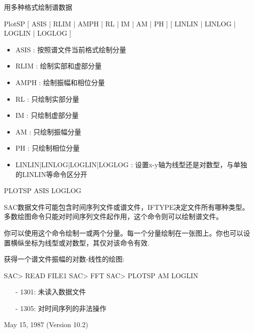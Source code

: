 \label{cmd:plotsp}

用多种格式绘制谱数据

PlotSP [ ASIS | RLIM | AMPH | RL | IM | AM | PH ] [ LINLIN | LINLOG | LOGLIN | LOGLOG ]

\begin{itemize}
\item ASIS :  按照谱文件当前格式绘制分量
\item RLIM :  绘制实部和虚部分量 
\item AMPH :  绘制振幅和相位分量 
\item RL :  只绘制实部分量 
\item IM :  只绘制虚部分量 
\item AM :  只绘制振幅分量 
\item PH :  只绘制相位分量 
\item LINLIN|LINLOG|LOGLIN|LOGLOG : 设置x-y轴为线型还是对数型，与单独的LINLIN等命令区分开
\end{itemize}

PLOTSP ASIS LOGLOG

SAC数据文件可能包含时间序列文件或谱文件，IFTYPE决定文件所有哪种类型。多数绘图命令只能对时间序列文件起作用，这个命令则可以绘制谱文件。

你可以使用这个命令绘制一或两个分量。每一个分量绘制在一张图上。你也可以设置横纵坐标为线型或对数型，其仅对该命令有效.

获得一个谱文件振幅的对数-线性的绘图:
\begin{SACCode}
SAC> READ FILE1
SAC> FFT
SAC> PLOTSP AM LOGLIN
\end{SACCode}

\begin{itemize}
\item[-]1301: 未读入数据文件
\item[-]1305: 对时间序列的非法操作
\end{itemize}

May 15, 1987 (Version 10.2)
